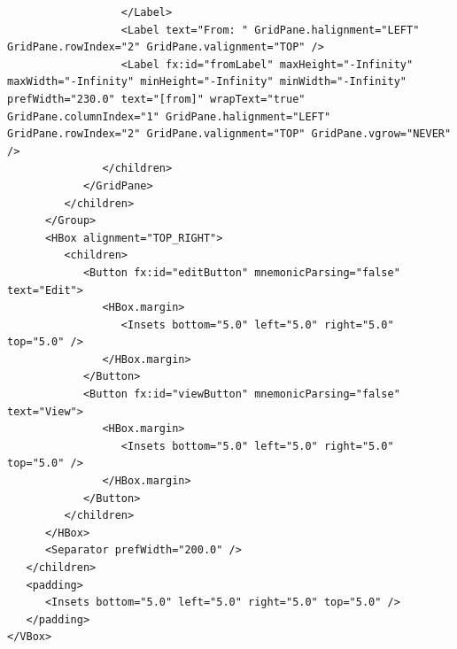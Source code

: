 \begin{lstlisting}
                  </Label>
                  <Label text="From: " GridPane.halignment="LEFT" GridPane.rowIndex="2" GridPane.valignment="TOP" />
                  <Label fx:id="fromLabel" maxHeight="-Infinity" maxWidth="-Infinity" minHeight="-Infinity" minWidth="-Infinity" prefWidth="230.0" text="[from]" wrapText="true" GridPane.columnIndex="1" GridPane.halignment="LEFT" GridPane.rowIndex="2" GridPane.valignment="TOP" GridPane.vgrow="NEVER" />
               </children>
            </GridPane>
         </children>
      </Group>
      <HBox alignment="TOP_RIGHT">
         <children>
            <Button fx:id="editButton" mnemonicParsing="false" text="Edit">
               <HBox.margin>
                  <Insets bottom="5.0" left="5.0" right="5.0" top="5.0" />
               </HBox.margin>
            </Button>
            <Button fx:id="viewButton" mnemonicParsing="false" text="View">
               <HBox.margin>
                  <Insets bottom="5.0" left="5.0" right="5.0" top="5.0" />
               </HBox.margin>
            </Button>
         </children>
      </HBox>
      <Separator prefWidth="200.0" />
   </children>
   <padding>
      <Insets bottom="5.0" left="5.0" right="5.0" top="5.0" />
   </padding>
</VBox>
\end{lstlisting}
